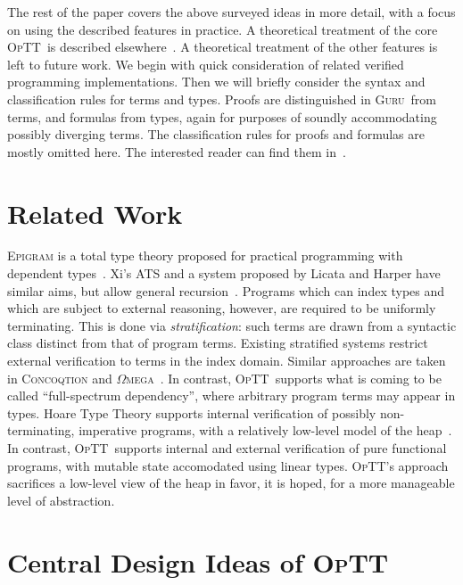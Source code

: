 \documentclass[preprint,natbib]{sigplanconf}
\newcommand{\optt}{\textsc{OpTT}}
\newcommand{\guru}[0]{\textsc{Guru}}
\begin{document}
The rest of the paper covers the above surveyed ideas in more detail,
with a focus on using the described features in practice.  A
theoretical treatment of the core \optt\ is described
elsewhere~\cite{optt}.  A theoretical treatment of the other
features is left to future work.  We begin with quick consideration of
related verified programming implementations.  Then we will briefly
consider the syntax and classification rules for terms and types.
Proofs are distinguished in \guru\ from terms, and formulas from
types, again for purposes of soundly accommodating possibly diverging
terms.  The classification rules for proofs and formulas are mostly
omitted here.  The interested reader can find them in~\cite{optt}.

\section{Related Work}

\textsc{Epigram} is a total type theory proposed for practical
programming with dependent types~\cite{mcbride+04}.  Xi's \textsc{ATS}
and a system proposed by Licata and Harper have similar aims, but
allow general recursion~\cite{licata+05,chenxi05}.  Programs which can
index types and which are subject to external reasoning, however, are
required to be uniformly terminating.  This is done via
\emph{stratification}: such terms are drawn from a syntactic class
distinct from that of program terms.  Existing stratified systems
restrict external verification to terms in the index domain.  Similar
approaches are taken in \textsc{Concoqtion} and
$\Omega$\textsc{mega}~\cite{pasalic+07,sheard06}.  In contrast, \optt\
supports what is coming to be called ``full-spectrum dependency'',
where arbitrary program terms may appear in types.  Hoare Type Theory
supports internal verification of possibly non-terminating, imperative
programs, with a relatively low-level model of the
heap~\cite{nanevski+05}.  In contrast, \optt\ supports internal and
external verification of pure functional programs, with mutable state
accomodated using linear types.  \optt's approach sacrifices a
low-level view of the heap in favor, it is hoped, for a more
manageable level of abstraction.

\section{Central Design Ideas of \optt}
\label{sec:optt}
\end{document}
